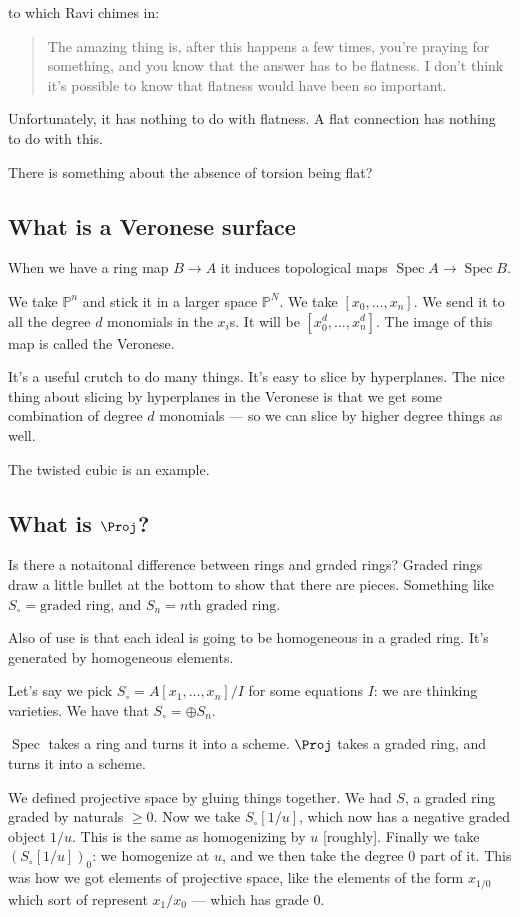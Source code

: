 \documentclass{book}
\renewcommand{\P}{\ensuremath{\mathbb{P}}}
\newcommand{\Spec}{\operatorname{Spec}}
\newcommand{\osum}{\oplus} %
\theoremstyle{definition}
\begin{document}
to which Ravi chimes in:
\begin{quote}
The amazing thing is, after this happens a few times, you're praying for
something, and you know that the answer has to be flatness. I don't think
it's possible to know that flatness would have been so important.
\end{quote}

Unfortunately, it has nothing to do with flatness. A flat connection
has nothing to do with this.

There is something about the absence of torsion being flat? 

\subsection{What is a Veronese surface}

When we have a ring map $B \rightarrow A$ it induces topological maps 
$\Spec A \rightarrow \Spec B$. 

We take $\P^n$ and stick it in a larger space $\P^N$. We take
$[x_0, \dots, x_n]$. We send it to all the degree $d$ monomials in the $x_i$s.
It will be $[x_0^d, \dots, x_n^d]$. The image of this map
is called the Veronese.

It's a useful crutch to do many things. It's easy to slice by hyperplanes.
The nice thing about slicing by hyperplanes in the Veronese is that we
get some combination of degree $d$ monomials --- so we can slice
by higher degree things as well.

The twisted cubic is an example.


\subsection{What is $\Proj$?}
Is there a notaitonal difference between rings and graded rings? Graded rings
draw a little bullet at the bottom to show that there are pieces. Something
like $S_\circ = \text{graded ring}$, and $S_n = \text{$n$th graded ring}$.


Also of use is that each ideal is going to be homogeneous in a graded ring.
It's generated by homogeneous elements.

Let's say we pick $S_\circ = A[x_1, \dots, x_n] / I$ for some equations $I$:
we are thinking varieties. We have that $S_\circ = \osum S_n$.


$\Spec$ takes a ring and turns it into a scheme. $\Proj$ takes a graded ring,
and turns it into a scheme.

We defined projective space by gluing things together. We had $S$, a graded
ring graded by naturals $\geq 0$. Now we take $S_\circ[1/u]$, which now
has a negative graded object $1/u$. This is the same as homogenizing by $u$ [roughly].
Finally we take $(S_\circ[1/u])_0$: we homogenize at $u$, and we then take the degree $0$
part of it. This was how we got elements of projective space, like the elements
of the form $x_{1/0}$ which sort of represent $x_1/x_0$ --- which has grade $0$.
\end{document}
